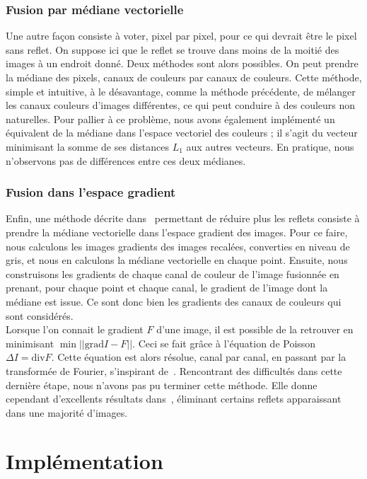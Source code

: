 \documentclass[12pt,a4paper]{article}
\begin{document}
\subsubsection{Fusion par médiane vectorielle}
Une autre façon consiste à voter, pixel par pixel, pour ce qui devrait être le pixel sans reflet. On suppose ici que le reflet se trouve dans moins de la moitié des images à un endroit donné. Deux méthodes sont alors possibles. On peut prendre la médiane des pixels, canaux de couleurs par canaux de couleurs. Cette méthode, simple et intuitive, à le désavantage, comme la méthode précédente, de mélanger les canaux couleurs d'images différentes, ce qui peut conduire à des couleurs non naturelles. Pour pallier à ce problème, nous avons également implémenté un équivalent de la médiane dans l'espace vectoriel des couleurs ; il s'agit du vecteur minimisant la somme de ses distances $L_1$ aux autres vecteurs. En pratique, nous n'observons pas de différences entre ces deux médianes. 
\subsubsection{Fusion dans l'espace gradient}
Enfin, une méthode décrite dans~\citep{haro2012photographing} permettant de réduire plus les reflets consiste à prendre la médiane vectorielle dans l'espace gradient des images. Pour ce faire, nous calculons les images gradients des images recalées, converties en niveau de gris, et nous en calculons la médiane vectorielle en chaque point. Ensuite, nous construisons les gradients de chaque canal de couleur de l'image fusionnée en prenant, pour chaque point et chaque canal, le gradient de l'image dont la médiane est issue. Ce sont donc bien les gradients des canaux de couleurs qui sont considérés.\\
Lorsque l'on connait le gradient $F$ d'une image, il est possible de la retrouver en minimisant $\min||\mathrm{grad}I - F||$. Ceci se fait grâce à l'équation de Poisson $\Delta I = \mathrm{div}F$. Cette équation est alors résolue, canal par canal, en passant par la transformée de Fourier, s'inspirant de~\citep{morel2010pde}. Rencontrant des difficultés dans cette dernière étape, nous n'avons pas pu terminer cette méthode. Elle donne cependant d'excellents résultats dans~\citep{haro2012photographing}, éliminant certains reflets apparaissant dans une majorité d'images.
\section{Implémentation}
\end{document}
